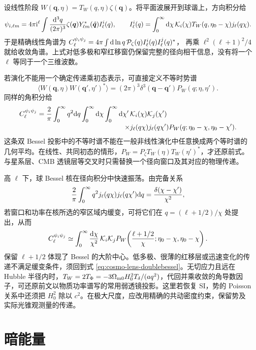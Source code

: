 设线性阶段 $W(\bm q,\eta)=T_W(q,\eta)\zeta(\bm q)$。将平面波展开到球谐上，方向积分给
\[
 \psi_{i,\ell m}=4\pi\mathrm{i}^\ell\int\frac{\dd^3q}{(2\pi)^3}
       \zeta(\bm q)Y_{\ell m}^*(\hat{\bm q})I^i_\ell(q),\qquad
 I^i_\ell(q)=\int_0^\infty\dd\chi\,\mathcal K_i(\chi)
                T_W(q,\eta_0-\chi)j_\ell(q\chi).
\]
于是精确线性角谱为 $C_\ell^{\psi_i\psi_j}
=4\pi\int\dd\ln q\,\mathcal P_\zeta(q)I^i_\ell(q)I^j_\ell(q)^*$，
再乘 $\ell^2(\ell+1)^2/4$ 就给收敛角谱。上式对低多极和窄红移窗仍保留完整的径向相干信息，没有将一个 $\ell$ 等同于一个三维波数。

若演化不能用一个确定传递乘初态表示，可直接定义不等时势谱
\[
 \langle W(\bm q,\eta)W(\bm q',\eta')^*\rangle
 =(2\pi)^3\delta^3(\bm q-\bm q')P_W(q;\eta,\eta').
\]
同样的角积分给
\begin{equation}\label{eq:cosmo-lens-doublebessel}
 \begin{aligned}
 C_\ell^{\psi_i\psi_j}=\frac2\pi\int_0^\infty q^2\dd q
  \int_0^\infty\dd\chi\int_0^\infty\dd\chi'\,
       &\mathcal K_i(\chi)\mathcal K_j(\chi')\\[-2pt]
       {}\times&j_\ell(q\chi)j_\ell(q\chi')
       P_W(q;\eta_0-\chi,\eta_0-\chi').
 \end{aligned}
\end{equation}
这条双 Bessel 投影中的不等时谱不能在一般非线性演化中任意换成两个等时谱的几何平均。在线性、共同初态的情形，$P_W=P_\zeta T_W(\eta)T_W(\eta')^*$，才还原前式。与星系层、CMB 透镜层等交叉时只需替换一个径向窗口及其对应的物理传递。

高 $\ell$ 下，球 Bessel 核在径向积分中快速振荡。由完备关系
\[
 \frac2\pi\int_0^\infty q^2 j_\ell(q\chi)j_\ell(q\chi')\dd q
                  =\frac{\delta(\chi-\chi')}{\chi^2},
\]
若窗口和功率在核所选的窄区域内缓变，可将它们在 $q=(\ell+1/2)/\chi$ 处提出，从而
\[
 C_\ell^{\psi_i\psi_j}\simeq
 \int_0^\infty\frac{\dd\chi}{\chi^2}\,
  \mathcal K_i\mathcal K_j
 P_W\!\left(\frac{\ell+1/2}{\chi};
              \eta_0-\chi,\eta_0-\chi\right).
\]
保留 $\ell+1/2$ 体现了 Bessel 的大阶中心。低多极、很薄的红移层或迅速变化的传递不满足缓变条件，须回到式 \eqref{eq:cosmo-lens-doublebessel}。无切应力且远在 Hubble 半径内时，$T_W=2T_\Phi=-3\Omega_{\rm m0}H_0^2T_\delta/(a q^2)$，代回并乘收敛的角导数因子，可还原前文以物质功率谱写的常用弱透镜投影。这里若恢复 SI，势的 Poisson 关系中还须把 $H_0^2$ 除以 $c^2$。在极大尺度，应改用精确的共动密度约束，保留势及实际光锥观测量的传递。

\section{暗能量}\label{sec:cosmo-dark-energy}

